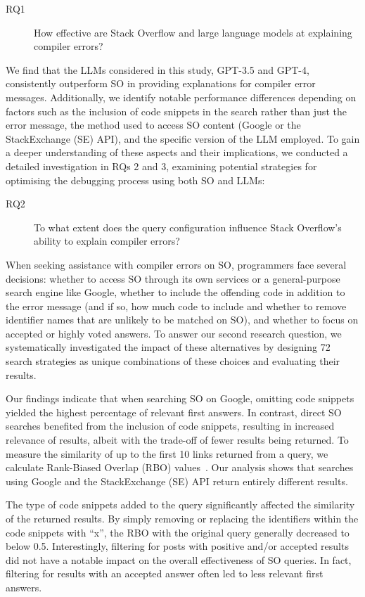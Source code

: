 \documentclass[preprint,12pt]{elsarticle}
\begin{document}
\begin{description}
\item[RQ1] How effective are Stack Overflow and large language models at explaining compiler errors?
\end{description}

We find that the LLMs considered in this study, GPT-3.5 and GPT-4, consistently outperform SO in providing explanations for compiler error messages. Additionally, we identify notable performance differences depending on factors such as the inclusion of code snippets in the search rather than just the error message, the method used to access SO content (Google or the StackExchange (SE) API), and the specific version of the LLM employed. To gain a deeper understanding of these aspects and their implications, we conducted a detailed investigation in RQs 2 and 3, examining potential strategies for optimising the debugging process using both SO and LLMs:

\begin{description}
\item[RQ2] To what extent does the query configuration influence Stack Overflow's ability to explain compiler errors?
\end{description}
When seeking assistance with compiler errors on SO, programmers face several decisions: whether to access SO through its own services or a general-purpose search engine like Google, whether to include the offending code in addition to the error message (and if so, how much code to include and whether to remove identifier names that are unlikely to be matched on SO), and whether to focus on accepted or highly voted answers. To answer our second research question, we systematically investigated the impact of these alternatives by designing 72 search strategies as unique combinations of these choices and evaluating their results.

Our findings indicate that when searching SO on Google, omitting code snippets yielded the highest percentage of relevant first answers. In contrast, direct SO searches benefited from the inclusion of code snippets, resulting in increased relevance of results, albeit with the trade-off of fewer results being returned. To measure the similarity of up to the first 10 links returned from a query, we calculate Rank-Biased Overlap (RBO) values~\cite{rbo}. Our analysis shows that searches using Google and the StackExchange (SE) API return entirely different results.

The type of code snippets added to the query significantly affected the similarity of the returned results. By simply removing or replacing the identifiers within the code snippets with ``x'', the RBO with the original query generally decreased to below 0.5. Interestingly, filtering for posts with positive and/or accepted results did not have a notable impact on the overall effectiveness of SO queries. In fact, filtering for results with an accepted answer often led to less relevant first answers.
\end{document}
